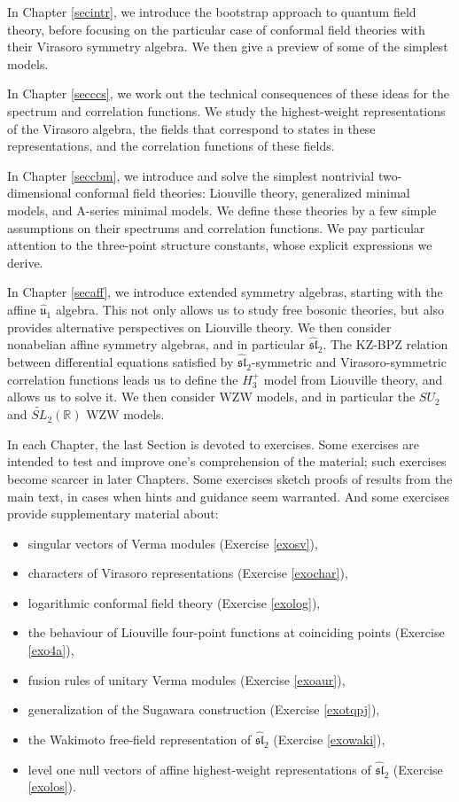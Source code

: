\documentclass[12pt, a4paper, notitlepage, twoside]{report}
\numberwithin{equation}{section}
\theoremstyle{break}
\begin{document}
In Chapter \ref{secintr}, we introduce the bootstrap approach to quantum field theory, before focusing on the particular case of conformal field theories with their Virasoro symmetry algebra.
We then give a preview of some of the simplest models.

In Chapter \ref{secccs}, we work out the technical consequences of these ideas for the spectrum and correlation functions.
We study the highest-weight representations of the Virasoro algebra, the fields that correspond to states in these representations, and the correlation functions of these fields. 

In Chapter \ref{seccbm}, we introduce and solve the simplest nontrivial two-dimensional conformal field theories: Liouville theory, generalized minimal models, and A-series minimal models.
We define these theories by a few simple assumptions on their spectrums and correlation functions.
We pay particular attention to the three-point structure constants, whose explicit expressions we derive. 

In Chapter \ref{secaff}, we introduce extended symmetry algebras, starting with the affine $\hat{\mathfrak{u}}_1$ algebra.
This not only allows us to study free bosonic theories, but also provides alternative perspectives on Liouville theory.
We then consider nonabelian affine symmetry algebras, and in particular $\widehat{\mathfrak{sl}}_2$.
The KZ-BPZ relation between differential equations satisfied by $\widehat{\mathfrak{sl}}_2$-symmetric and Virasoro-symmetric correlation functions leads us to define the $H_3^+$ model from Liouville theory, and allows us to solve it.
We then consider WZW models, and in particular the $SU_2$ and $\widetilde{SL}_2(\mathbb{R})$ WZW models. 

In each Chapter, the last Section is devoted to exercises.
Some exercises are intended to test and improve one's comprehension of the material; such exercises become scarcer in later Chapters.
Some exercises sketch proofs of results from the main text, in cases when hints and guidance seem warranted.
And some exercises provide supplementary material about: 
\begin{itemize}
 \item singular vectors of Verma modules (Exercise \ref{exosv}),
 \item characters of Virasoro representations (Exercise \ref{exochar}),
\item logarithmic conformal field theory (Exercise \ref{exolog}), 
\item the behaviour of Liouville four-point functions at coinciding points (Exercise \ref{exo4a}),
\item fusion rules of unitary Verma modules (Exercise \ref{exoaur}), 
\item generalization of the Sugawara construction (Exercise \ref{exotqpj}),
\item the Wakimoto free-field representation of $\widehat{\mathfrak{sl}}_2$ (Exercise \ref{exowaki}),
\item level one null vectors of affine highest-weight representations of $\widehat{\mathfrak{sl}}_2$ (Exercise \ref{exolos}).
\end{itemize}
\end{document}
